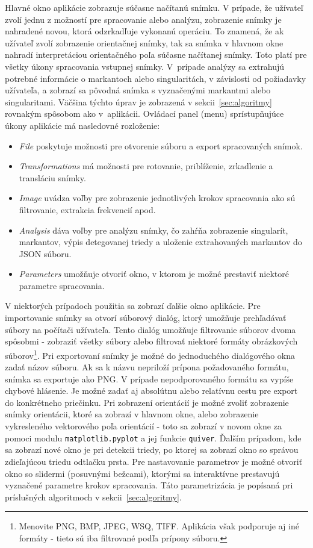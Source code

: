   Hlavné okno aplikácie zobrazuje súčasne načítanú snímku. V prípade, že užívateľ zvolí jednu z možností pre spracovanie alebo analýzu, zobrazenie snímky je
  nahradené novou, ktorá odzrkadľuje vykonanú operáciu. To znamená, že ak užívateľ zvolí zobrazenie orientačnej snímky, tak sa snímka v hlavnom okne nahradí
  interpretáciou orientačného poľa súčasne načítanej snímky. Toto platí pre všetky úkony spracovania vstupnej snímky. V~prípade analýzy sa extrahujú potrebné
  informácie o markantoch alebo singularitách, v závislosti od požiadavky užívateľa, a zobrazí sa pôvodná snímka s vyznačenými markantmi alebo singularitami.
  Väčšina týchto úprav je zobrazená v sekcii~{\ref{sec:algoritmy}} rovnakým spôsobom ako v~aplikácii. Ovládací panel (menu) sprístupňujúce úkony aplikácie má
  nasledovné rozloženie:
  \begin{itemize}
    \item \emph{File} poskytuje možnosti pre otvorenie súboru a export spracovaných snímok.
    \item \emph{Transformations} má možnosti pre rotovanie, priblíženie, zrkadlenie a transláciu snímky.
    \item \emph{Image} uvádza voľby pre zobrazenie jednotlivých krokov spracovania ako sú filtrovanie, extrakcia frekvencií apod.
    \item \emph{Analysis} dáva voľby pre analýzu snímky, čo zahŕňa zobrazenie singularít, markantov, výpis detegovanej triedy a uloženie extrahovaných
          markantov do JSON súboru.
    \item \emph{Parameters} umožňuje otvoriť okno, v ktorom je možné prestaviť niektoré parametre spracovania.
  \end{itemize}

  V niektorých prípadoch použitia sa zobrazí ďalšie okno aplikácie. Pre importovanie snímky sa otvorí súborový dialóg, ktorý umožňuje prehľadávať súbory
  na počítači užívateľa. Tento dialóg umožňuje filtrovanie súborov dvoma spôsobmi - zobraziť všetky súbory alebo filtrovať niektoré formáty obrázkových
  súborov\footnote{Menovite PNG, BMP, JPEG, WSQ, TIFF. Aplikácia však podporuje aj iné formáty - tieto sú iba filtrované podľa prípony súboru.}.
  Pri exportovaní snímky je možné do jednoduchého dialógového okna zadať názov súboru. Ak sa k názvu nepriloží prípona požadovaného formátu, snímka sa
  exportuje ako PNG. V prípade nepodporovaného formátu sa vypíše chybové hlásenie. Je možné zadať aj absolútnu alebo relatívnu cestu pre export do konkrétneho
  priečinku. Pri zobrazení orientácií je možné zvoliť zobrazenie snímky orientácii, ktoré sa zobrazí v hlavnom okne, alebo zobrazenie vykresleného vektorového
  poľa orientácií - toto sa zobrazí v novom okne za pomoci modulu \texttt{matplotlib.pyplot} a jej funkcie \texttt{quiver}. Ďalším prípadom, kde sa zobrazí nové
  okno je pri detekcii triedy, po ktorej sa zobrazí okno so správou zdieľajúcou triedu odtlačku prsta. Pre nastavovanie parametrov je možné otvoriť okno
  so slidermi (posuvnými bežcami), ktorými sa interaktívne prestavujú vyznačené parametre krokov spracovania. Táto parametrizácia je popísaná pri príslušných
  algoritmoch v sekcii~{\ref{sec:algoritmy}}.

